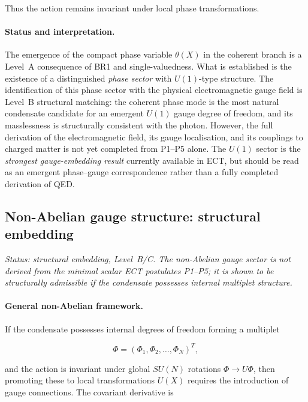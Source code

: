 \documentclass[11pt,a4paper]{article}
\numberwithin{equation}{section}
\begin{document}
Thus the action remains invariant under local phase transformations.

\paragraph{Status and interpretation.}
The emergence of the compact phase variable $\theta(X)$ in the coherent
branch is a Level~A consequence of BR1 and single-valuedness.
What is established is the existence of a distinguished \emph{phase sector}
with $U(1)$-type structure.
The identification of this phase sector with the physical electromagnetic
gauge field is Level~B structural matching:
the coherent phase mode is the most natural condensate candidate for an
emergent $U(1)$ gauge degree of freedom, and its masslessness is
structurally consistent with the photon.
However, the full derivation of the electromagnetic field,
its gauge localisation, and its couplings to charged matter is not yet
completed from P1--P5 alone.
The $U(1)$ sector is the \emph{strongest gauge-embedding result}
currently available in ECT, but should be read as an emergent
phase--gauge correspondence rather than a fully completed derivation of QED.

\subsection{Non-Abelian gauge structure: structural embedding}
\label{sec:nonabelian_embedding}

\textit{Status: structural embedding, Level~B/C.
The non-Abelian gauge sector is not derived from the minimal scalar
ECT postulates P1--P5; it is shown to be structurally admissible
if the condensate possesses internal multiplet structure.}

\paragraph{General non-Abelian framework.}

If the condensate possesses internal degrees of freedom
forming a multiplet

\begin{equation}
\Phi = (\Phi_1,\Phi_2,\dots,\Phi_N)^T ,
\end{equation}

and the action is invariant under global $SU(N)$ rotations
$\Phi \to U\Phi$, then promoting these to local transformations
$U(X)$ requires the introduction of gauge connections.
The covariant derivative is
\end{document}

